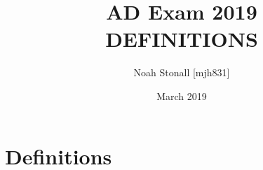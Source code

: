 \documentclass{article}
\title{AD Exam 2019 \\ DEFINITIONS}
\author{Noah Stonall [mjh831]}
\date{March 2019}
\begin{document}
\maketitle

\section*{Definitions}

\end{document}
